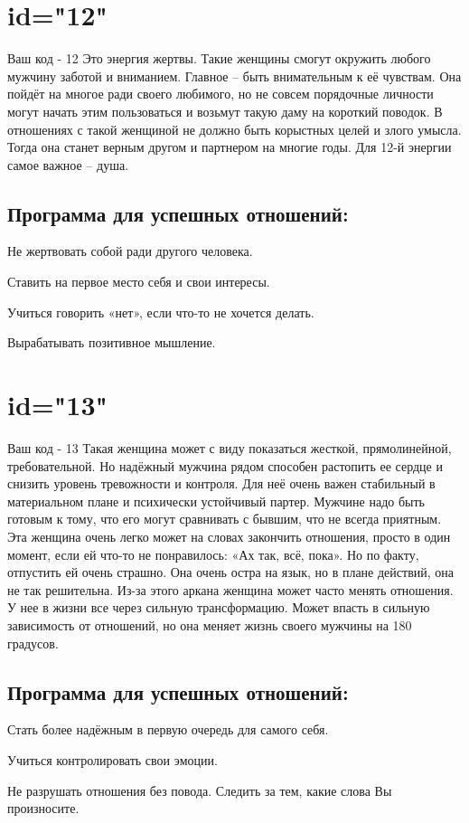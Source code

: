 \section{id="12"}{Ваш код - 12}
Это энергия жертвы. Такие женщины смогут окружить любого мужчину 
заботой и вниманием. Главное – быть внимательным к её чувствам. Она 
пойдёт на многое ради своего любимого, но не совсем порядочные 
личности могут начать этим пользоваться и возьмут такую даму на 
короткий поводок. В отношениях с такой женщиной не должно быть 
корыстных целей и злого умысла. Тогда она станет верным другом и 
партнером на многие годы. Для 12-й энергии самое важное – душа.
\subsection{Программа для успешных отношений:}
\item Не жертвовать собой ради другого человека.
\item Ставить на первое место себя и свои интересы.
\item Учиться говорить «нет», если что-то не хочется делать.
\item Вырабатывать позитивное мышление.
\endsubsection
\endsection

\section{id="13"}{Ваш код - 13}
Такая женщина может с виду показаться жесткой, прямолинейной, 
требовательной. Но надёжный мужчина рядом способен растопить ее 
сердце и снизить уровень тревожности и контроля. Для неё очень 
важен стабильный в материальном плане и психически устойчивый 
партер. Мужчине надо быть готовым к тому, что его могут сравнивать 
с бывшим, что не всегда приятным. Эта женщина очень легко может 
на словах закончить отношения, просто в один момент, если ей что-то 
не понравилось: «Ах так, всё, пока». Но по факту, отпустить ей 
очень страшно. Она очень остра на язык, но в плане действий, она 
не так решительна. Из-за этого аркана женщина может часто менять 
отношения. У нее в жизни все через сильную трансформацию. Может 
впасть в сильную зависимость от отношений, но она меняет жизнь 
своего мужчины на 180 градусов.
\subsection{Программа для успешных отношений:}
\item Стать более надёжным в первую очередь для самого себя.
\item Учиться контролировать свои эмоции.
\item Не разрушать отношения без повода. Следить за тем, какие 
слова Вы произносите.
\endsubsection
\endsection

